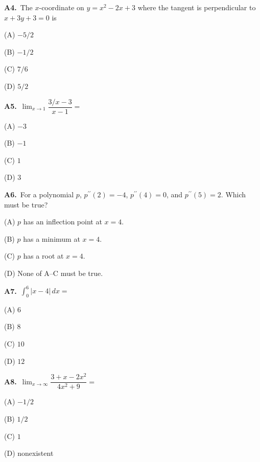 \documentclass[11pt]{article}
\begin{document}
\bigskip\noindent\textbf{A4.}\ The $x$-coordinate on $y=x^2-2x+3$ where the tangent is perpendicular to $x+3y+3=0$ is
\begin{list}{}{\setlength{\leftmargin}{3em}\setlength{\labelwidth}{2.5em}\setlength{\itemsep}{0pt}\setlength{\topsep}{2pt}}
\item[(A)] $-5/2$
\item[(B)] $-1/2$
\item[(C)] $7/6$
\item[(D)] $5/2$
\end{list}

\bigskip\noindent\textbf{A5.}\ $\lim_{x\to1}\dfrac{3/x-3}{x-1}=$
\begin{list}{}{\setlength{\leftmargin}{3em}\setlength{\labelwidth}{2.5em}\setlength{\itemsep}{0pt}\setlength{\topsep}{2pt}}
\item[(A)] $-3$
\item[(B)] $-1$
\item[(C)] $1$
\item[(D)] $3$
\end{list}

\bigskip\noindent\textbf{A6.}\ For a polynomial $p$, $p^{\prime\prime}(2)=-4$, $p^{\prime\prime}(4)=0$, and $p^{\prime\prime}(5)=2$. Which must be true?
\begin{list}{}{\setlength{\leftmargin}{3em}\setlength{\labelwidth}{2.5em}\setlength{\itemsep}{0pt}\setlength{\topsep}{2pt}}
\item[(A)] $p$ has an inflection point at $x=4$.
\item[(B)] $p$ has a minimum at $x=4$.
\item[(C)] $p$ has a root at $x=4$.
\item[(D)] None of A–C must be true.
\end{list}

\bigskip\noindent\textbf{A7.}\ $\int_0^6|x-4|\,dx=$
\begin{list}{}{\setlength{\leftmargin}{3em}\setlength{\labelwidth}{2.5em}\setlength{\itemsep}{0pt}\setlength{\topsep}{2pt}}
\item[(A)] $6$
\item[(B)] $8$
\item[(C)] $10$
\item[(D)] $12$
\end{list}

\bigskip\noindent\textbf{A8.}\ $\lim_{x\to\infty}\dfrac{3+x-2x^2}{4x^2+9}=$
\begin{list}{}{\setlength{\leftmargin}{3em}\setlength{\labelwidth}{2.5em}\setlength{\itemsep}{0pt}\setlength{\topsep}{2pt}}
\item[(A)] $-1/2$
\item[(B)] $1/2$
\item[(C)] $1$
\item[(D)] nonexistent
\end{list}
\end{document}
